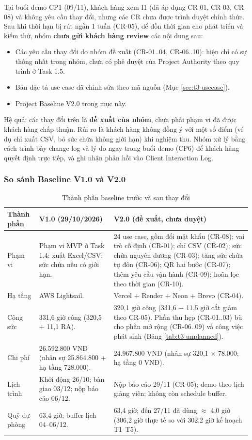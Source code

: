 Tại buổi demo CP1 (09/11), khách hàng xem I1 (đã áp dụng CR-01, CR-03, CR-08) và không yêu cầu thay đổi, nhưng các CR chưa được trình duyệt chính thức. Sau khi thời hạn bị rút ngắn 1 tuần (CR-05), để dồn thời gian cho phát triển và kiểm thử, nhóm \textbf{chưa gửi khách hàng review} các nội dung sau:
\begin{itemize}
    \item Các yêu cầu thay đổi do nhóm đề xuất (CR-01..04, CR-06..10): hiện chỉ có sự thống nhất trong nhóm, chưa có phê duyệt của Project Authority theo quy trình ở Task 1.5.
    \item Bản đặc tả use case đã chỉnh sửa theo mã nguồn (Mục \ref{sec:t3-usecase}).
    \item Project Baseline V2.0 trong mục này.
\end{itemize}
Hệ quả: các thay đổi trên là \textbf{đề xuất của nhóm}, chưa phải phạm vi đã được khách hàng chấp thuận. Rủi ro là khách hàng không đồng ý với một số điểm (ví dụ chỉ xuất CSV, bỏ sức chứa không giới hạn) khi nghiệm thu. Nhóm xử lý bằng cách trình bày change log và lý do ngay trong buổi demo (CP6) để khách hàng quyết định trực tiếp, và ghi nhận phản hồi vào Client Interaction Log.

\subsubsection{So sánh Baseline V1.0 và V2.0}

\begin{table}[H]
\centering\small
\caption{Thành phần baseline trước và sau thay đổi}\label{tab:t3-v1-v2}
\begin{tabularx}{\linewidth}{@{}p{.18\linewidth}XX@{}}
\toprule
\textbf{Thành phần} & \textbf{V1.0 (29/10/2026)} & \textbf{V2.0 (đề xuất, chưa duyệt)}\\\midrule
Phạm vi & Phạm vi MVP ở Task 1.4: xuất Excel/CSV; sức chứa nếu có giới hạn. & 24 use case, gồm đổi mật khẩu (CR-08); vai trò cố định (CR-01); chỉ CSV (CR-02); sức chứa nguyên dương (CR-03); tăng sức chứa tự đôn (CR-06); QR hai bước (CR-07); thêm yêu cầu vận hành (CR-09); hoãn lọc theo thời gian (CR-10).\\
Hạ tầng & AWS Lightsail. & Vercel + Render + Neon + Brevo (CR-04).\\
Công sức & 331,6 giờ công (320,5 + 11,1 RA). & 320,1 giờ công (331,6 $-$ 11,5 giờ cắt giảm theo CR-05). Phần thu hẹp (CR-01..03) bù cho phần mở rộng (CR-06..09) và công việc phát sinh (Bảng \ref{tab:t3-unplanned}).\\
Chi phí & 26.592.800 VNĐ (nhân sự 25.864.800 + hạ tầng 728.000). & 24.967.800 VNĐ (nhân sự 320,1 $\times$ 78.000; hạ tầng 0 VNĐ).\\
Lịch trình & Khởi động 26/10; bàn giao 03/12; nộp báo cáo 06/12. & Nộp báo cáo 29/11 (CR-05); demo theo lịch giảng viên; không còn schedule buffer.\\
Quỹ dự phòng & 63,4 giờ; buffer lịch 04--06/12. & 63,4 giờ; đến 27/11 đã dùng $\approx$ 4,0 giờ (306,2 giờ thực tế so với 302,2 giờ kế hoạch T1--T5).\\
\bottomrule
\end{tabularx}
\end{table}
